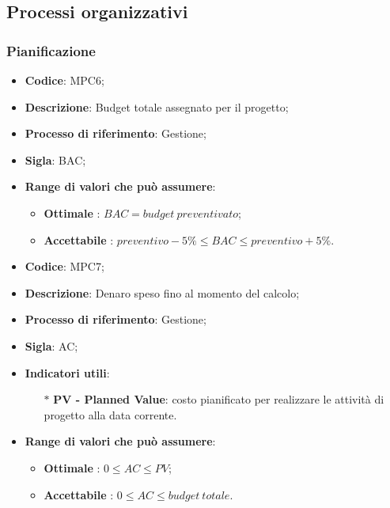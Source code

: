 \subsection{Processi organizzativi}
\subsubsection{Pianificazione}
\vspace{-1cm}
\begin{itemize}
	\item \textbf{Codice}: MPC6;
	\item \textbf{Descrizione}: Budget totale assegnato per il progetto;
	\item \textbf{Processo di riferimento}: Gestione;
	\item \textbf{Sigla}: BAC;
	\item \textbf{Range di valori che può assumere}: 
		\begin{itemize}
			\item \textbf{Ottimale} : $BAC = budget \ preventivato$;
			\item \textbf{Accettabile} : $preventivo - 5 \% \leq BAC \leq preventivo + 5 \%$.
		\end{itemize}
\end{itemize}
\vspace{-1cm}
\begin{itemize}
	\item \textbf{Codice}: MPC7;
	\item \textbf{Descrizione}: Denaro speso fino al momento del calcolo;
	\item \textbf{Processo di riferimento}: Gestione;
	\item \textbf{Sigla}: AC;
	\item \textbf{Indicatori utili}: 
		\begin{itemize}
			\item[$\ast$] \textbf{PV - Planned Value}: costo pianificato per realizzare le attività di progetto alla data corrente.
		\end{itemize}
	\item \textbf{Range di valori che può assumere}: 
		\begin{itemize}
			\item \textbf{Ottimale} : $0 \leq AC \leq PV $;
			\item \textbf{Accettabile} : $0 \leq AC \leq budget \ totale $.
		\end{itemize}
\end{itemize}
